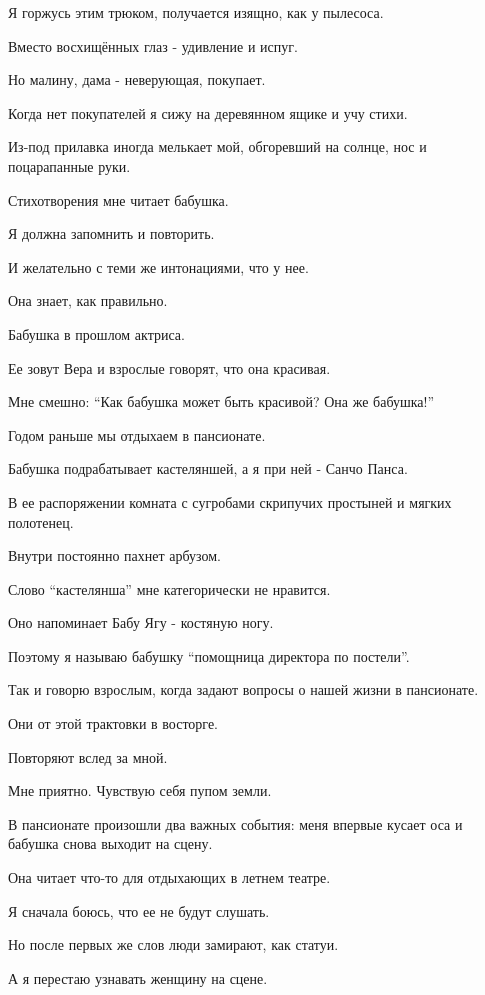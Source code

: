 Я горжусь этим трюком,  получается изящно,   как у  пылесоса. 

Вместо восхищённых глаз -  удивление и испуг. 

Но малину,  дама - неверующая, покупает.  

Когда нет покупателей я  сижу на деревянном ящике и учу стихи.

Из-под  прилавка иногда  мелькает  мой, обгоревший на солнце, нос и
поцарапанные руки.  

Стихотворения мне читает бабушка. 

Я должна запомнить и повторить. 

И желательно с теми же интонациями, что у нее. 

Она знает, как правильно.

Бабушка в прошлом актриса.

Ее зовут Вера и взрослые говорят, что она красивая. 

Мне смешно: \enquote{Как бабушка может быть красивой? Она же  бабушка!}

Годом раньше мы   отдыхаем  в пансионате.

Бабушка подрабатывает  кастеляншей, а я  при ней -  Санчо Панса. 

В ее распоряжении комната с  сугробами  скрипучих   простыней и мягких
полотенец. 

Внутри постоянно  пахнет арбузом.  

Слово \enquote{кастелянша} мне категорически не нравится. 

Оно напоминает  Бабу Ягу - костяную ногу.  

Поэтому я называю  бабушку \enquote{помощница  директора по постели}.  

Так и говорю взрослым, когда задают вопросы о нашей  жизни в пансионате. 

Они  от этой трактовки в восторге.

Повторяют вслед за мной. 

Мне приятно. Чувствую себя пупом земли. 

В пансионате произошли два важных события: меня впервые кусает оса и бабушка
снова выходит на сцену. 

Она читает что-то для отдыхающих в летнем театре. 

Я сначала боюсь, что ее не будут слушать. 

Но после первых же слов люди замирают, как статуи. 

А я  перестаю узнавать женщину на сцене.

